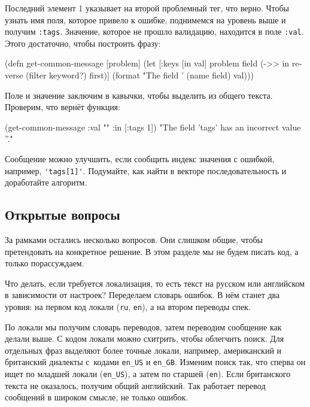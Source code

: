 Последний элемент 1 указывает на второй проблемный тег, что верно. Чтобы узнать
имя поля, которое привело к ошибке, поднимемся на уровень выше и получим
\verb|:tags|.  Значение, которое не прошло валидацию, находится в поле
\verb|:val|. Этого достаточно, чтобы построить фразу:

\begin{english}
  \begin{clojure}
(defn get-common-message [problem]
  (let [{:keys [in val]} problem
        field (->> in
                   reverse
                   (filter keyword?)
                   first)]
    (format "The field '%
            (name field) val)))
  \end{clojure}
\end{english}

Поле и значение заключим в кавычки, чтобы выделить из общего текста. Проверим,
что вернёт функция:

\begin{english}
  \begin{clojure}
(get-common-message {:val "" :in [:tags 1]})
"The field 'tags' has an incorrect value ''."
  \end{clojure}
\end{english}

Сообщение можно улучшить, если сообщить индекс значения с ошибкой, например,
\verb|'tags[1]'|. Подумайте, как найти в векторе последовательность
 и доработайте алгоритм.

\subsection{Открытые вопросы}

За рамками остались несколько вопросов. Они слишком общие, чтобы претендовать на
конкретное решение. В этом разделе мы не будем писать код, а только
порассуждаем.

Что делать, если требуется локализация, то есть текст на русском или английском
в зависимости от настроек? Переделаем словарь ошибок. В нём станет два уровня:
на первом код локали (\verb|ru|, \verb|en|), а на втором переводы спек.


По локали мы получим словарь переводов, затем переводим сообщение как делали
выше. С кодом локали можно схитрить, чтобы облегчить поиск. Для отдельных фраз
выделяют более точные локали, например, американский и британский диалекты
с~кодами \verb|en_US| и \verb|en_GB|. Изменим поиск так, что сперва он ищет
по младшей локали (\verb|en_US|), а затем по старшей (\verb|en|). Если
британского текста не оказалось, получим общий английский. Так работает перевод
сообщений в широком смысле, не только ошибок.

